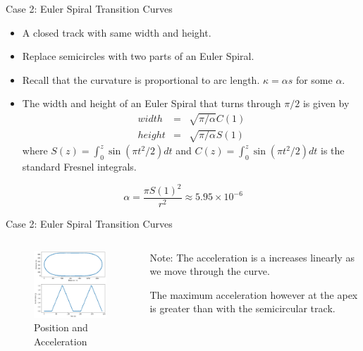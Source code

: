 \documentclass{beamer}
\begin{document}
\begin{frame}{Case 2: Euler Spiral Transition Curves}
	\begin{itemize}
		\item A closed track with same width and height. 
		\item Replace semicircles with two parts of an Euler Spiral.
		\item Recall that the curvature is proportional to arc length. $\kappa = \alpha s $ for some $\alpha$.
		\item The width and height of an Euler Spiral that turns through $\pi/2$ is given by 
		\begin{eqnarray*}
			width &=& \sqrt{\pi / \alpha} C(1) \\
			height &=& \sqrt{\pi /\alpha}S(1)
		\end{eqnarray*}
		where $S(z)=\int_{0}^{z}\sin \left( \pi t^2 / 2 \right) dt$ and $C(z)=\int_{0}^{z}\sin \left( \pi t^2 / 2 \right) dt$  is the standard Fresnel integrals.
	
	\end{itemize}
	
	\[
	\alpha = \frac{\pi S(1)^2}{r^2} \approx 5.95 \times 10 ^{-6}
	\]
	
\end{frame}

\begin{frame}{Case 2: Euler Spiral Transition Curves}
	\begin{columns}
		\begin{column}{0.8\textwidth}			
			\begin{figure}
				\caption{Position and Acceleration}
				\centering
				\includegraphics[width=70mm, scale=0.2]{euler_track.png}
			\end{figure}
		\end{column}
		\begin{column}{0.33\textwidth}
			Note: The acceleration is a increases linearly as we move through the curve.
			
			The maximum acceleration however at the apex is greater than with the semicircular track. 
					
		\end{column}
	\end{columns}

\end{frame}
\end{document}
